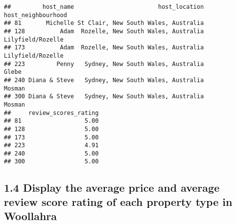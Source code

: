\documentclass[
]{article}
\newenvironment{Shaded}{\begin{snugshade}}{\end{snugshade}}
\newcommand{\DecValTok}[1]{\textcolor[rgb]{0.00,0.00,0.81}{#1}}
\newcommand{\FloatTok}[1]{\textcolor[rgb]{0.00,0.00,0.81}{#1}}
\newcommand{\FunctionTok}[1]{\textcolor[rgb]{0.00,0.00,0.00}{#1}}
\newcommand{\NormalTok}[1]{#1}
\newcommand{\OtherTok}[1]{\textcolor[rgb]{0.56,0.35,0.01}{#1}}
\newcommand{\SpecialCharTok}[1]{\textcolor[rgb]{0.00,0.00,0.00}{#1}}
\newcommand{\StringTok}[1]{\textcolor[rgb]{0.31,0.60,0.02}{#1}}
\begin{document}
\begin{Shaded}
\end{Shaded}

\begin{verbatim}
##         host_name                        host_location host_neighbourhood
## 81       Michelle St Clair, New South Wales, Australia                   
## 128          Adam  Rozelle, New South Wales, Australia  Lilyfield/Rozelle
## 173          Adam  Rozelle, New South Wales, Australia  Lilyfield/Rozelle
## 223         Penny   Sydney, New South Wales, Australia              Glebe
## 240 Diana & Steve   Sydney, New South Wales, Australia             Mosman
## 300 Diana & Steve   Sydney, New South Wales, Australia             Mosman
##     review_scores_rating
## 81                  5.00
## 128                 5.00
## 173                 5.00
## 223                 4.91
## 240                 5.00
## 300                 5.00
\end{verbatim}

\hypertarget{display-the-average-price-and-average-review-score-rating-of-each-property-type-in-woollahra}{%
\subsection{1.4 Display the average price and average review score
rating of each property type in
Woollahra}\label{display-the-average-price-and-average-review-score-rating-of-each-property-type-in-woollahra}}
\end{document}
